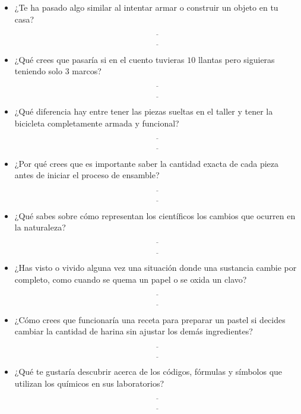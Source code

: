 \documentclass[
  spanish,
  letterpaper,
  12pt,
  oneside,
  open=any]{scrbook}
\begin{document}
\begin{itemize}
\item
  ¿Te ha pasado algo similar al intentar armar o construir un objeto en
  tu casa?

  \[\underline{\hspace{6cm}}\]

  \[\underline{\hspace{6cm}}\]
\item
  ¿Qué crees que pasaría si en el cuento tuvieras \(10\) llantas pero
  siguieras teniendo solo \(3\) marcos?

  \[\underline{\hspace{6cm}}\]

  \[\underline{\hspace{6cm}}\]
\item
  ¿Qué diferencia hay entre tener las piezas sueltas en el taller y
  tener la bicicleta completamente armada y funcional?

  \[\underline{\hspace{6cm}}\]

  \[\underline{\hspace{6cm}}\]
\item
  ¿Por qué crees que es importante saber la cantidad exacta de cada
  pieza antes de iniciar el proceso de ensamble?

  \[\underline{\hspace{6cm}}\]

  \[\underline{\hspace{6cm}}\]
\item
  ¿Qué sabes sobre cómo representan los científicos los cambios que
  ocurren en la naturaleza?

  \[\underline{\hspace{6cm}}\]

  \[\underline{\hspace{6cm}}\]
\item
  ¿Has visto o vivido alguna vez una situación donde una sustancia
  cambie por completo, como cuando se quema un papel o se oxida un
  clavo?

  \[\underline{\hspace{6cm}}\]

  \[\underline{\hspace{6cm}}\]
\item
  ¿Cómo crees que funcionaría una receta para preparar un pastel si
  decides cambiar la cantidad de harina sin ajustar los demás
  ingredientes?

  \[\underline{\hspace{6cm}}\]

  \[\underline{\hspace{6cm}}\]
\item
  ¿Qué te gustaría descubrir acerca de los códigos, fórmulas y símbolos
  que utilizan los químicos en sus laboratorios?

  \[\underline{\hspace{6cm}}\]

  \[\underline{\hspace{6cm}}\]
\end{itemize}
\end{document}

